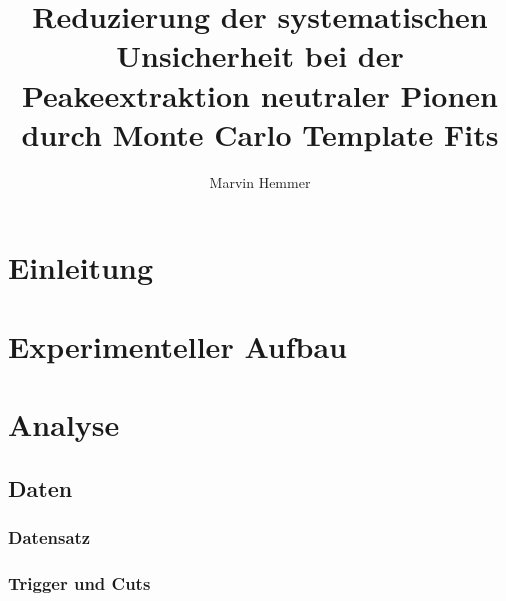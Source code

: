 \documentclass[]{article}
\title{Reduzierung der systematischen Unsicherheit bei der Peakeextraktion neutraler Pionen durch Monte Carlo Template Fits}
\author{Marvin Hemmer}
\begin{document}
\maketitle
\newpage
\tableofcontents
\newpage

	\section{Einleitung}

	\section{Experimenteller Aufbau}

	\section{Analyse}
	\subsection{Daten}
	\subsubsection{Datensatz}
	\subsubsection{Trigger und Cuts}
\end{document}
